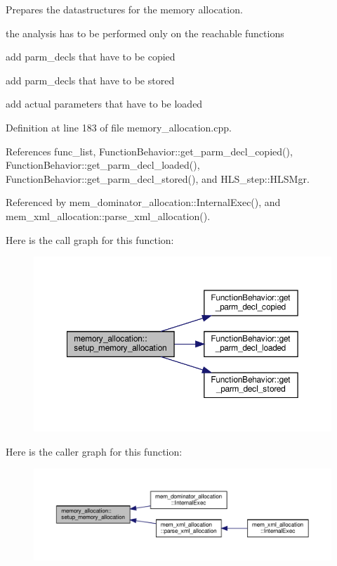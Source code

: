 Prepares the datastructures for the memory allocation. 

the analysis has to be performed only on the reachable functions

add parm\+\_\+decls that have to be copied

add parm\+\_\+decls that have to be stored

add actual parameters that have to be loaded 

Definition at line 183 of file memory\+\_\+allocation.\+cpp.



References func\+\_\+list, Function\+Behavior\+::get\+\_\+parm\+\_\+decl\+\_\+copied(), Function\+Behavior\+::get\+\_\+parm\+\_\+decl\+\_\+loaded(), Function\+Behavior\+::get\+\_\+parm\+\_\+decl\+\_\+stored(), and H\+L\+S\+\_\+step\+::\+H\+L\+S\+Mgr.



Referenced by mem\+\_\+dominator\+\_\+allocation\+::\+Internal\+Exec(), and mem\+\_\+xml\+\_\+allocation\+::parse\+\_\+xml\+\_\+allocation().

Here is the call graph for this function\+:
\nopagebreak
\begin{figure}[H]
\begin{center}
\leavevmode
\includegraphics[width=350pt]{db/d9f/classmemory__allocation_a6710be700bffc38ad1a65f2b24f7b863_cgraph}
\end{center}
\end{figure}
Here is the caller graph for this function\+:
\nopagebreak
\begin{figure}[H]
\begin{center}
\leavevmode
\includegraphics[width=350pt]{db/d9f/classmemory__allocation_a6710be700bffc38ad1a65f2b24f7b863_icgraph}
\end{center}
\end{figure}


